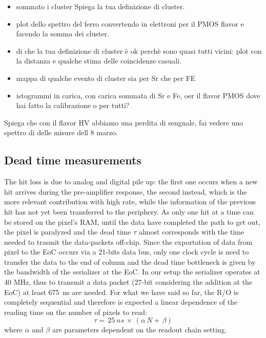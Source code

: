         \begin{itemize}
            \item sommato i cluster Spiega la tua definizione di cluster.
            \item plot dello spettro del ferro convertendo in elettroni per il PMOS flavor e facendo la somma dei cluster. 
            \item di che la tua definizione di cluster è ok perchè sono quasi tutti vicini: plot con la distanza e qualche stima delle coincidenze casuali.
            \item mappa di qualche evento di cluster sia per Sr che per FE
            \item istogrammi in carica, con carica sommata di Sr e Fe, oer il flavor PMOS dove hai fatto la calibrazione o per tutti?
        \end{itemize}

        Spiega che con il flavor HV abbiamo una perdita di sengnale, fai vedere uno spettro di delle misure dell 8 marzo. 

       
   
         
    \subsection{Dead time measurements}
        The hit loss is due to analog and digital pile up: the first one occurs when a new hit arrives during the pre-amplifier response, the second instead, which is the more relevant contribution with high rate, while the information of the previous hit has not yet been transferred to the periphery.  
        As only one hit at a time can be stored on the pixel's RAM, until the data have completed the path to get out, the pixel is paralyzed and the dead time $\tau$ almost corresponds with the time needed to trasmit the data-packets off-chip.
        Since the exportation of data from pixel to the EoC occurs via a 21-bits data bus, only one clock cycle is need to transfer the data to the end of column and the dead time bottleneck is given by the bandwidth of the serializer at the EoC. In our setup the serializer operates at 40 MHz, thus to transmit a data packet (27-bit considering the addition at the EoC) at least \SI{675}{ns} are needed. 
        For what we have said so far, the R/O is completely sequential and therefore is expected a linear dependence of the reading time on the number of pixels to read:
        \begin{equation}
            \tau =\, 25\: \unit{ns}\, \times\, (\alpha\, N +\, \beta)
            \label{eq:reading_time}
        \end{equation}
        where $\alpha$ and $\beta$ are parameters dependent on the readout chain setting. 
        

